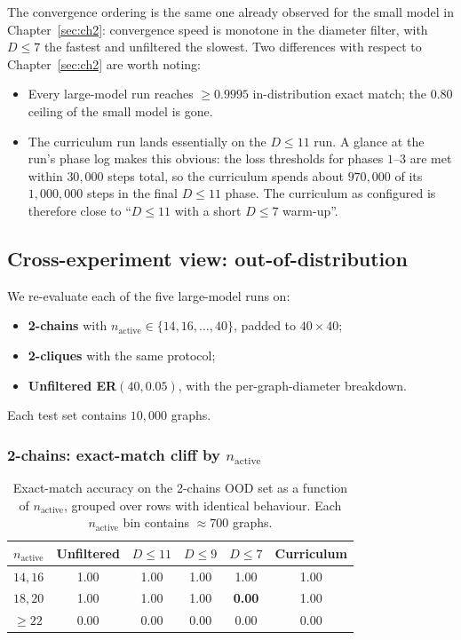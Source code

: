 \documentclass[11pt,a4paper]{article}
\begin{document}
The convergence ordering is the same one already observed for the small
model in Chapter~\ref{sec:ch2}: convergence speed is monotone in the
diameter filter, with $D \le 7$ the fastest and unfiltered the slowest.
Two differences with respect to Chapter~\ref{sec:ch2} are worth noting:
\begin{itemize}
    \item Every large-model run reaches $\ge 0.9995$ in-distribution
          exact match; the $0.80$ ceiling of the small model is gone.
    \item The curriculum run lands essentially on the $D \le 11$ run.
          A glance at the run's phase log makes this obvious: the loss
          thresholds for phases $1$--$3$ are met within $30{,}000$ steps
          total, so the curriculum spends about $970{,}000$ of its
          $1{,}000{,}000$ steps in the final $D \le 11$ phase. The
          curriculum as configured is therefore close to ``$D \le 11$
          with a short $D \le 7$ warm-up''.
\end{itemize}

\subsection{Cross-experiment view: out-of-distribution}
\label{sec:ch3-cross-ood}

We re-evaluate each of the five large-model runs on:
\begin{itemize}
    \item \textbf{2-chains} with $n_{\text{active}} \in \{14, 16, \ldots, 40\}$,
          padded to $40 \times 40$;
    \item \textbf{2-cliques} with the same protocol;
    \item \textbf{Unfiltered ER}$(40, 0.05)$, with the per-graph-diameter
          breakdown.
\end{itemize}
Each test set contains $10{,}000$ graphs.

\subsubsection*{2-chains: exact-match cliff by $n_{\text{active}}$}

\begin{table}[H]
\centering
\begin{tabular}{lccccc}
\toprule
$n_{\text{active}}$ & Unfiltered & $D \le 11$ & $D \le 9$ & $D \le 7$ & Curriculum \\
\midrule
$14, 16$  & 1.00 & 1.00 & 1.00 & 1.00 & 1.00 \\
$18, 20$  & 1.00 & 1.00 & 1.00 & \textbf{0.00} & 1.00 \\
$\ge 22$  & 0.00 & 0.00 & 0.00 & 0.00 & 0.00 \\
\bottomrule
\end{tabular}
\caption{Exact-match accuracy on the 2-chains OOD set as a function of
$n_{\text{active}}$, grouped over rows with identical behaviour. Each
$n_{\text{active}}$ bin contains $\approx 700$ graphs.}
\label{tab:big-chains-byn}
\end{table}
\end{document}
